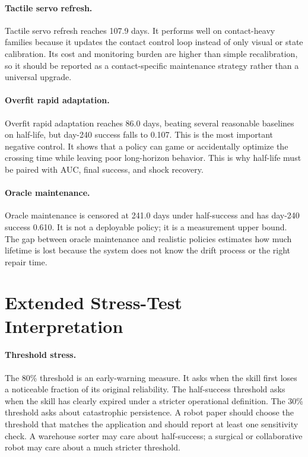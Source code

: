 \documentclass{article}
\begin{document}
\paragraph{Tactile servo refresh.}
Tactile servo refresh reaches 107.9 days. It performs well on contact-heavy
families because it updates the contact control loop instead of only visual or
state calibration. Its cost and monitoring burden are higher than simple
recalibration, so it should be reported as a contact-specific maintenance
strategy rather than a universal upgrade.

\paragraph{Overfit rapid adaptation.}
Overfit rapid adaptation reaches 86.0 days, beating several reasonable
baselines on half-life, but day-240 success falls to 0.107. This is the most
important negative control. It shows that a policy can game or accidentally
optimize the crossing time while leaving poor long-horizon behavior. This is
why half-life must be paired with AUC, final success, and shock recovery.

\paragraph{Oracle maintenance.}
Oracle maintenance is censored at 241.0 days under half-success and has
day-240 success 0.610. It is not a deployable policy; it is a measurement upper
bound. The gap between oracle maintenance and realistic policies estimates how
much lifetime is lost because the system does not know the drift process or the
right repair time.

\section{Extended Stress-Test Interpretation}

\paragraph{Threshold stress.}
The 80\% threshold is an early-warning measure. It asks when the skill first
loses a noticeable fraction of its original reliability. The half-success
threshold asks when the skill has clearly expired under a stricter operational
definition. The 30\% threshold asks about catastrophic persistence. A robot
paper should choose the threshold that matches the application and should
report at least one sensitivity check. A warehouse sorter may care about
half-success; a surgical or collaborative robot may care about a much stricter
threshold.
\end{document}
